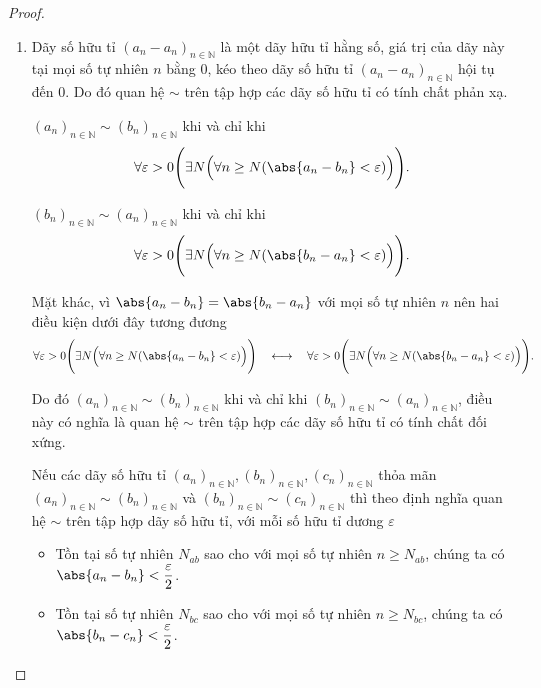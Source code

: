 \begin{proof}
    \begin{enumerate}[label={(\roman*)},itemsep=0pt]
        \item Dãy số hữu tỉ ${(a_{n} - a_{n})}_{n\in\mathbb{N}}$ là một dãy hữu tỉ hằng số, giá trị của dãy này tại mọi số tự nhiên $n$ bằng $0$, kéo theo dãy số hữu tỉ ${(a_{n} - a_{n})}_{n\in\mathbb{N}}$ hội tụ đến $0$. Do đó quan hệ $\sim$ trên tập hợp các dãy số hữu tỉ có tính chất phản xạ.

              ${(a_{n})}_{n\in\mathbb{N}}\sim {(b_{n})}_{n\in\mathbb{N}}$ khi và chỉ khi
              \[
                  \forall\varepsilon > 0\Biggl( \exists N \Bigl( \forall n\geq N ( \abs{a_{n} - b_{n}} < \varepsilon ) \Bigr) \Biggr).
              \]

              ${(b_{n})}_{n\in\mathbb{N}}\sim {(a_{n})}_{n\in\mathbb{N}}$ khi và chỉ khi
              \[
                  \forall\varepsilon > 0\Biggl( \exists N \Bigl( \forall n\geq N ( \abs{b_{n} - a_{n}} < \varepsilon ) \Bigr) \Biggr).
              \]

              Mặt khác, vì $\abs{a_{n} - b_{n}} = \abs{b_{n} - a_{n}}$ với mọi số tự nhiên $n$ nên hai điều kiện dưới đây tương đương
              \[
                  \forall\varepsilon > 0\Biggl( \exists N \Bigl( \forall n\geq N ( \abs{a_{n} - b_{n}} < \varepsilon ) \Bigr) \Biggr) \quad\longleftrightarrow\quad \forall\varepsilon > 0\Biggl( \exists N \Bigl( \forall n\geq N ( \abs{b_{n} - a_{n}} < \varepsilon ) \Bigr) \Biggr).
              \]

              Do đó ${(a_{n})}_{n\in\mathbb{N}} \sim {(b_{n})}_{n\in\mathbb{N}}$ khi và chỉ khi ${(b_{n})}_{n\in\mathbb{N}} \sim {(a_{n})}_{n\in\mathbb{N}}$, điều này có nghĩa là quan hệ $\sim$ trên tập hợp các dãy số hữu tỉ có tính chất đối xứng.

              Nếu các dãy số hữu tỉ ${(a_{n})}_{n\in\mathbb{N}}, {(b_{n})}_{n\in\mathbb{N}}, {(c_{n})}_{n\in\mathbb{N}}$ thỏa mãn ${(a_{n})}_{n\in\mathbb{N}}\sim {(b_{n})}_{n\in\mathbb{N}}$ và ${(b_{n})}_{n\in\mathbb{N}}\sim {(c_{n})}_{n\in\mathbb{N}}$ thì theo định nghĩa quan hệ $\sim$ trên tập hợp dãy số hữu tỉ, với mỗi số hữu tỉ dương $\varepsilon$
              \begin{itemize}
                  \item Tồn tại số tự nhiên $N_{ab}$ sao cho với mọi số tự nhiên $n\geq N_{ab}$, chúng ta có $\abs{a_{n} - b_{n}} < \dfrac{\varepsilon}{2}$.
                  \item Tồn tại số tự nhiên $N_{bc}$ sao cho với mọi số tự nhiên $n\geq N_{bc}$, chúng ta có $\abs{b_{n} - c_{n}} < \dfrac{\varepsilon}{2}$.
              \end{itemize}


\end{enumerate}
\end{proof}
